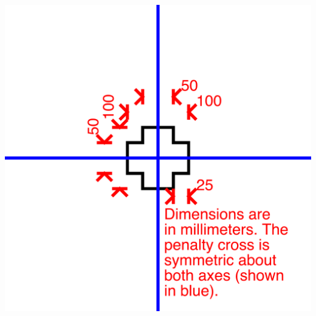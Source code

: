 \centerline{\includegraphics[origin=c,width=0.5\columnwidth]{figs/fieldDimensions2020_technical_pc.pdf}}

